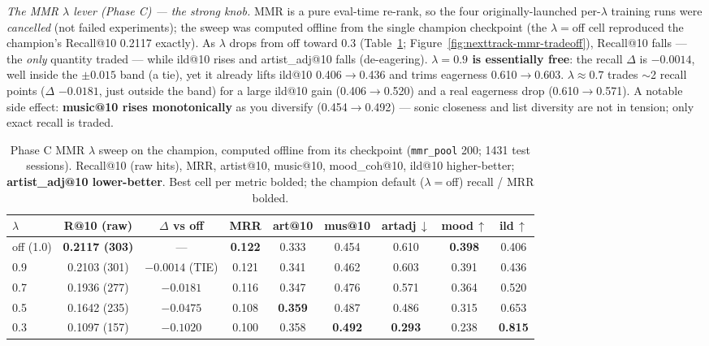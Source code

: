 \documentclass[11pt]{article}
\newcommand{\best}[1]{\textbf{#1}}
\begin{document}
\emph{The MMR $\lambda$ lever (Phase C) --- the strong knob.} MMR is a pure
eval-time re-rank, so the four originally-launched per-$\lambda$ training runs were
\emph{cancelled} (not failed experiments); the sweep was computed offline from the
single champion checkpoint (the $\lambda{=}$off cell reproduced the champion's
Recall@10 \num{0.2117} exactly). As $\lambda$ drops from off toward \num{0.3}
(Table~\ref{tab:nexttrack-mmr-sweep}; Figure~\ref{fig:nexttrack-mmr-tradeoff}), Recall@10 falls
--- the \emph{only} quantity traded --- while ild@10 rises and artist\_adj@10 falls
(de-eagering). \textbf{$\lambda{=}\num{0.9}$ is essentially free}: the recall
$\Delta$ is $-\num{0.0014}$, well inside the $\pm\num{0.015}$ band (a tie), yet it
already lifts ild@10 \num{0.406}$\to$\num{0.436} and trims eagerness
\num{0.610}$\to$\num{0.603}. \textbf{$\lambda\approx\num{0.7}$} trades $\sim$2 recall
points ($\Delta$ $-\num{0.0181}$, just outside the band) for a large ild@10 gain
(\num{0.406}$\to$\num{0.520}) and a real eagerness drop
(\num{0.610}$\to$\num{0.571}). A notable side effect: \textbf{music@10 rises
monotonically} as you diversify (\num{0.454}$\to$\num{0.492}) --- sonic closeness and
list diversity are not in tension; only exact recall is traded.

\begin{table}[ht]
  \centering
  \caption{Phase C MMR $\lambda$ sweep on the champion, computed offline from its
  checkpoint (\texttt{mmr\_pool} \num{200}; \num{1431} test sessions). Recall@10 (raw
  hits), MRR, artist@10, music@10, mood\_coh@10, ild@10 higher-better;
  \textbf{artist\_adj@10 lower-better}. Best cell per metric bolded; the champion
  default ($\lambda{=}$off) recall / MRR bolded.}
  \label{tab:nexttrack-mmr-sweep}
  {\footnotesize\setlength{\tabcolsep}{4pt}\begin{tabular}{lcccccccc}
    \toprule
    $\lambda$ & R@10 (raw) & $\Delta$ vs off & MRR & art@10 & mus@10 & artadj\,$\downarrow$ & mood\,$\uparrow$ & ild\,$\uparrow$ \\
    \midrule
    off (1.0) & \best{0.2117 (303)} & --- & \best{0.122} & 0.333 & 0.454 & 0.610 & \best{0.398} & 0.406 \\
    0.9 & 0.2103 (301) & $-0.0014$ (TIE) & 0.121 & 0.341 & 0.462 & 0.603 & 0.391 & 0.436 \\
    0.7 & 0.1936 (277) & $-0.0181$ & 0.116 & 0.347 & 0.476 & 0.571 & 0.364 & 0.520 \\
    0.5 & 0.1642 (235) & $-0.0475$ & 0.108 & \best{0.359} & 0.487 & 0.486 & 0.315 & 0.653 \\
    0.3 & 0.1097 (157) & $-0.1020$ & 0.100 & 0.358 & \best{0.492} & \best{0.293} & 0.238 & \best{0.815} \\
    \bottomrule
  \end{tabular}}
\end{table}
\end{document}
